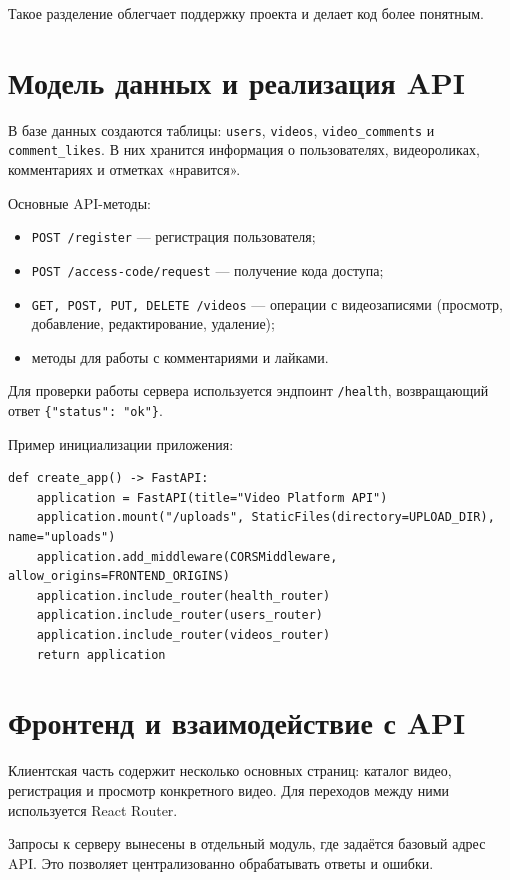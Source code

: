 Такое разделение облегчает поддержку проекта и делает код более понятным.

\section{Модель данных и реализация API}

В базе данных создаются таблицы: \texttt{users}, \texttt{videos}, \texttt{video\_comments} и \texttt{comment\_likes}. В них хранится информация о пользователях, видеороликах, комментариях и отметках «нравится».

Основные API-методы:
\begin{itemize}
    \item \texttt{POST /register} — регистрация пользователя;
    \item \texttt{POST /access-code/request} — получение кода доступа;
    \item \texttt{GET, POST, PUT, DELETE /videos} — операции с видеозаписями (просмотр, добавление, редактирование, удаление);
    \item методы для работы с комментариями и лайками.
\end{itemize}

Для проверки работы сервера используется эндпоинт \texttt{/health}, возвращающий ответ \texttt{\{"status": "ok"\}}.

Пример инициализации приложения:

\begin{verbatim}
def create_app() -> FastAPI:
    application = FastAPI(title="Video Platform API")
    application.mount("/uploads", StaticFiles(directory=UPLOAD_DIR), name="uploads")
    application.add_middleware(CORSMiddleware, allow_origins=FRONTEND_ORIGINS)
    application.include_router(health_router)
    application.include_router(users_router)
    application.include_router(videos_router)
    return application
\end{verbatim}

\section{Фронтенд и взаимодействие с API}

Клиентская часть содержит несколько основных страниц: каталог видео, регистрация и просмотр конкретного видео. Для переходов между ними используется React Router.

Запросы к серверу вынесены в отдельный модуль, где задаётся базовый адрес API. Это позволяет централизованно обрабатывать ответы и ошибки.

